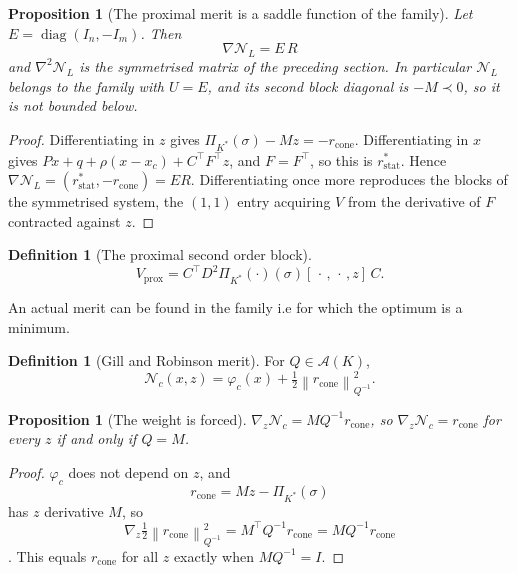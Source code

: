 \documentclass[a4paper,11pt]{book}
\theoremstyle{plain}
\newtheorem{proposition}[theorem]{Proposition}
\theoremstyle{definition}
\newtheorem{definition}[theorem]{Definition}
\theoremstyle{remark}
\numberwithin{equation}{chapter}
\numberwithin{algorithm}{chapter}
\newcommand{\proj}[2]{\Pi_{#2}\!\left(#1\right)}
\newcommand{\norm}[1]{\left\|#1\right\|}
\newcommand{\diag}{\operatorname{diag}}
\begin{document}
	\begin{proposition}[The proximal merit is a saddle function of the family]
		Let $E=\diag(I_n,-I_m)$. Then $$\nabla\mathcal{N}_L=E\,R$$ and
		$\nabla^2\mathcal{N}_L$ is the symmetrised matrix of the preceding section. In
		particular $\mathcal{N}_L$ belongs to the family with $U=E$, and its second
		block diagonal is $-M\prec0$, so it is not bounded below.
	\end{proposition}
	
	\begin{proof}
		Differentiating in $z$ gives $\proj{\sigma}{K^*}-Mz=-r_{\mathrm{cone}}$.
		Differentiating in $x$ gives
		$Px+q+\rho(x-x_c)+C^\top F^\top z$, and $F=F^\top$, so this is
		$r^{*}_{\mathrm{stat}}$. Hence $\nabla\mathcal{N}_L=(r^{*}_{\mathrm{stat}},
		-r_{\mathrm{cone}})=E R$. Differentiating once more reproduces the blocks of
		the symmetrised system, the $(1,1)$ entry acquiring $V$ from the derivative of
		$F$ contracted against $z$.
	\end{proof}
	
	\begin{definition}[The proximal second order block]
		\begin{equation}
			V_{\mathrm{prox}}
			=C^\top D^2\proj{\cdot}{K^*}(\sigma)[\,\cdot\,,\,\cdot\,,z]\,C .
		\end{equation}
	\end{definition}
	
	An actual merit can be found in the family i.e for which the optimum is a minimum.
	\begin{definition}[Gill and Robinson merit]
		For $Q\in\mathcal{A}(K)$,
		\begin{equation}
			\mathcal{N}_c(x,z)=\varphi_c(x)
			+\tfrac12\norm{r_{\mathrm{cone}}}^2_{Q^{-1}} .
		\end{equation}
	\end{definition}
	
	\begin{proposition}[The weight is forced]
		$\nabla_z\mathcal{N}_c=MQ^{-1}r_{\mathrm{cone}}$, so
		$\nabla_z\mathcal{N}_c=r_{\mathrm{cone}}$ for every $z$ if and only if $Q=M$.
	\end{proposition}
	
	\begin{proof}
		$\varphi_c$ does not depend on $z$, and
		$$r_{\mathrm{cone}}=Mz-\proj{\sigma}{K^*}$$ has $z$ derivative $M$, so
		$$\nabla_z\tfrac12\norm{r_{\mathrm{cone}}}^2_{Q^{-1}}
		=M^\top Q^{-1}r_{\mathrm{cone}}=MQ^{-1}r_{\mathrm{cone}}$$. This equals
		$r_{\mathrm{cone}}$ for all $z$ exactly when $MQ^{-1}=I$.
	\end{proof}
	
\end{document}
